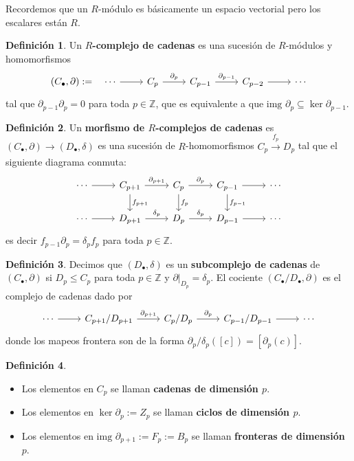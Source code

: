 \documentclass[spanish]{book}
\theoremstyle{definition}
\newtheorem*{defn}{Definición}
\begin{document}
	Recordemos que un $R$-módulo es básicamente un espacio vectorial pero los escalares están $R$.
	\begin{defn}
		Un \textbf{$R$-complejo de cadenas} es una sucesión de $R$-módulos y homomorfismos
		\[\begin{tikzcd}
			(C_\bullet,\partial):= \quad \cdots \arrow{r} & C_p \arrow{r}{\partial_p} & C_{p-1} \arrow{r}{\partial_{p-1}} & C_{p-2} \arrow{r} & \cdots
		\end{tikzcd}\]
		tal que $\partial_{p-1}\partial_p=0$ para toda $p\in \mathbb{Z}$, que es equivalente a que $\text{img }\partial_p\subseteq\ker{\partial_{p-1}}$.
	\end{defn}
	
	\begin{defn}
		Un \textbf{morfismo de $R$-complejos de cadenas} es $(C_\bullet{},\partial)\to(D_\bullet{},\delta)$ es una sucesión de $R$-homomorfismos $C_p\xrightarrow[]{f_p} D_p$ tal que el siguiente diagrama conmuta:
		\[
		\begin{tikzcd}
			\cdots \arrow{r} & C_{p+1} \arrow{r}{\partial_{p+1}} \arrow{d}{f_{p+1}} & C_p \arrow{r}{\partial_p} \arrow{d}{f_p} & C_{p-1} \arrow{r} \arrow{d}{f_{p-1}} & \cdots \\
			\cdots \arrow{r} & D_{p+1} \arrow{r}{\delta_p} & D_p \arrow{r}{\delta_p} & D_{p-1} \arrow{r} & \cdots
		\end{tikzcd}
		\]
		es decir $f_{p-1}\partial_p=\delta_pf_p$ para toda $p\in\mathbb{Z}$.
	\end{defn}
	\begin{defn}
		Decimos que $(D_\bullet,\delta)$ es un \textbf{subcomplejo de cadenas} de $(C_\bullet,\partial)$ si $D_p\leq C_p$ para toda $p\in\mathbb Z$ y $\partial|_{D_p}=\delta_p$. El cociente $(C_\bullet/D_\bullet,\partial)$ es el complejo de cadenas dado por
		\[
		\begin{tikzcd}
			\cdots \arrow{r} & C_{p+1}/D_{p+1} \arrow{r}{\partial_{p+1}} & C_{p}/D_{p} \arrow{r}{\partial_{p}} & C_{p-1}/D_{p-1} \arrow{r} & \cdots
		\end{tikzcd}
		\]
		donde los mapeos frontera son de la forma $\partial_p/\delta_p([c])=[\partial_p(c)]$.
	\end{defn}
	\begin{defn}\leavevmode
		\begin{itemize}
			\item Los elementos en $C_p$ se llaman \textbf{cadenas de dimensión $p$}.
			\item Los elementos en $\ker\partial_p:=Z_p$ se llaman \textbf{ciclos de dimensión $p$}.
			\item Los elementos en $\text{img }\partial_{p+1}:=F_p:=B_p$ se llaman \textbf{fronteras de dimensión $p$}.
		\end{itemize}
	\end{defn}
	
\end{document}
